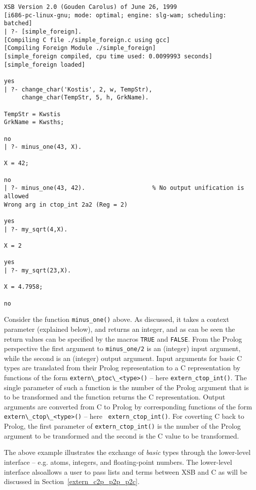 \begin{small}
\begin{verbatim}
XSB Version 2.0 (Gouden Carolus) of June 26, 1999
[i686-pc-linux-gnu; mode: optimal; engine: slg-wam; scheduling: batched]
| ?- [simple_foreign].
[Compiling C file ./simple_foreign.c using gcc]
[Compiling Foreign Module ./simple_foreign]
[simple_foreign compiled, cpu time used: 0.0099993 seconds]
[simple_foreign loaded]

yes
| ?- change_char('Kostis', 2, w, TempStr), 
     change_char(TempStr, 5, h, GrkName).  

TempStr = Kwstis
GrkName = Kwsths;

no
| ?- minus_one(43, X).

X = 42;

no
| ?- minus_one(43, 42).                   % No output unification is allowed
Wrong arg in ctop_int 2a2 (Reg = 2)

yes
| ?- my_sqrt(4,X). 

X = 2

yes
| ?- my_sqrt(23,X).

X = 4.7958;

no
\end{verbatim}
\end{small}

Consider the function {\tt minus\_one()} above.  As discussed, it
takes a context parameter (explained below), and returns an integer,
and as can be seen the return values can be specified by the macros
{\tt TRUE} and {\tt FALSE}.  From the Prolog perspective the first
argument to {\tt minus\_one/2} is an (integer) input argument, while
the second is an (integer) output argument.  Input arguments for basic
C types are translated from their Prolog representation to a C
representation by functions of the form \verb|extern\_ptoc\_<type>()|
-- here {\tt extern\_ctop\_int()}.  The single parameter of such a
function is the number of the Prolog argument that is to be
transformed and the function returns the C representation.  Output
arguments are converted from C to Prolog by corresponding functions of
the form \verb|extern\_ctop\_<type>()| -- here {\tt
  extern\_ctop\_int()}.  For coverting C back to Prolog, the first
parameter of {\tt extern\_ctop\_int()} is the number of the Prolog
argument to be transformed and the second is the C value to be
transformed.

The above example illustrates the exchange of {\em basic} types
through the lower-level interface -- e.g. atoms, integers, and
floating-point numbers.  The lower-level interface alsoallows a user
to pass lists and terms between XSB and C as will be discussed in
Section~\ref{extern_c2p_p2p_p2c}.

